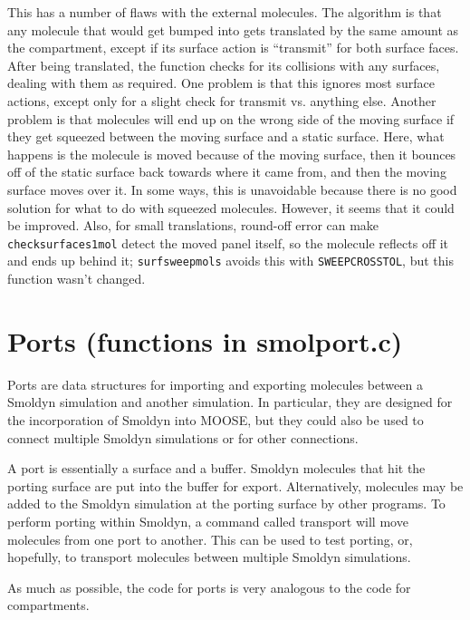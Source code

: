\documentclass {scrbook}
\newcommand {\ttt} {\texttt}
\begin{document}
\begin{description}
This has a number of flaws with the external molecules. The algorithm is that any molecule that would get bumped into gets translated by the same amount as the compartment, except if its surface action is ``transmit'' for both surface faces. After being translated, the function checks for its collisions with any surfaces, dealing with them as required. One problem is that this ignores most surface actions, except only for a slight check for transmit vs. anything else. Another problem is that molecules will end up on the wrong side of the moving surface if they get squeezed between the moving surface and a static surface. Here, what happens is the molecule is moved because of the moving surface, then it bounces off of the static surface back towards where it came from, and then the moving surface moves over it. In some ways, this is unavoidable because there is no good solution for what to do with squeezed molecules. However, it seems that it could be improved. Also, for small translations, round-off error can make \ttt{checksurfaces1mol} detect the moved panel itself, so the molecule reflects off it and ends up behind it; \ttt{surfsweepmols} avoids this with \ttt{SWEEPCROSSTOL}, but this function wasn't changed.

\end{description}

\section{Ports (functions in smolport.c)}

Ports are data structures for importing and exporting molecules between a Smoldyn simulation and another simulation. In particular, they are designed for the incorporation of Smoldyn into MOOSE, but they could also be used to connect multiple Smoldyn simulations or for other connections.

A port is essentially a surface and a buffer. Smoldyn molecules that hit the porting surface are put into the buffer for export. Alternatively, molecules may be added to the Smoldyn simulation at the porting surface by other programs. To perform porting within Smoldyn, a command called transport will move molecules from one port to another. This can be used to test porting, or, hopefully, to transport molecules between multiple Smoldyn simulations.

As much as possible, the code for ports is very analogous to the code for compartments.
\end{document}
